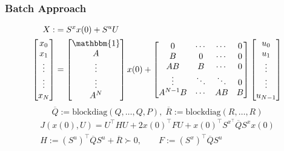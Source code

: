 \subsubsection{Batch Approach}\label{short:sec:batch_lqr}
\begin{align*}
    X:              & =S^x x(0)+S^u U \\
    \begin{bmatrix}
        x_0    \\
        x_1    \\
        \vdots \\
        \vdots \\
        x_N
    \end{bmatrix} & =
    \begin{bmatrix}
        \mathbbm{1} \\
        A           \\
        \vdots      \\
        \vdots      \\
        A^N
    \end{bmatrix}x(0)+
    \begin{bmatrix}
        0        & \cdots & \cdots & 0 \\
        B        & 0      & \cdots & 0 \\
        AB       & B      & \cdots & 0 \\
        \vdots   & \ddots & \ddots & 0 \\
        A^{N-1}B & \cdots & AB     & B
    \end{bmatrix}
    \begin{bmatrix}
        u_0    \\
        u_1    \\
        \vdots \\
        \vdots \\
        u_{N-1}
    \end{bmatrix}
\end{align*}
\begin{equation*}
    \overline{Q}:=\mathrm{blockdiag}(Q,\dots,Q,P),\; \overline{R}:=\mathrm{blockdiag}(R,\dots,R)
\end{equation*}
\begin{gather*}
    J(x(0), U) =U^{\top}HU+2{x(0)}^{\top}FU+{x(0)}^{\top}S^{x^{\top}}\overline{Q}S^{x}x(0)\\
    H:={(S^u)}^\top\overline{Q} S^u+\overline{R} \succ 0,\qquad F:={(S^x)}^\top\overline{Q} S^u
\end{gather*}

